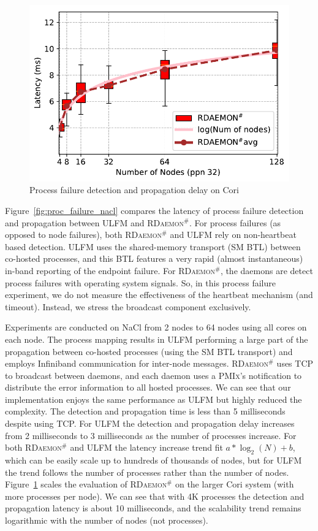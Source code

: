 \documentclass[sigconf]{acmart}
\newcommand{\pmix}[0]{\textsc{PMIx}\xspace}
\newcommand{\ulfm}[0]{\textsc{ULFM}\xspace}
\newcommand{\ourwork}[0]{\textsc{RDaemon}\ensuremath{^\#}\xspace}
\begin{document}
\begin{figure}[h]
  \centering
  \includegraphics[width=\linewidth]{Cori_Process_Failure_fit.pdf}
  \caption{Process failure detection and propagation delay on Cori}
  \label{fig:proc_failure_cori}
\end{figure}

Figure~\ref{fig:proc_failure_nacl} compares the latency of process failure detection and propagation between \ulfm and \ourwork. For process failures (as opposed to node failures), both 
\ourwork and \ulfm rely on non-heartbeat based detection. 
%
\ulfm uses the 
shared-memory transport (SM BTL) between co-hosted processes, and this BTL 
features a very rapid (almost instantaneous) in-band reporting of the 
endpoint failure. For \ourwork, the daemons are detect process failures
with operating system signals. 
%
So, in this process failure experiment, we do not measure 
the effectiveness of the heartbeat mechanism (and timeout). Instead, we  
stress the broadcast component exclusively.

Experiments are conducted on NaCl from 2 nodes to 64 nodes using all cores on each node.
The process mapping results in \ulfm performing a large part of the 
propagation between co-hosted processes (using the SM BTL transport) 
and employs Infiniband communication for inter-node messages. 
\ourwork uses TCP to broadcast between daemons, and each daemon uses a
\pmix's notification to distribute the error information to all hosted processes.
%
 We can see that our implementation enjoys the same performance as \ulfm but highly reduced the complexity. The detection and propagation time is less than 5 milliseconds despite using TCP. For \ulfm the detection and propagation delay increases from 2 milliseconds to 3 milliseconds as the  number of processes increase. For both \ourwork and \ulfm the latency increase trend fit $ a*\log_2(N) + b $, which can be easily scale up to hundreds of thousands of nodes, but for \ulfm
the trend follows the number of processes rather than the number of nodes. Figure~\ref{fig:proc_failure_cori} scales the evaluation of \ourwork on the larger Cori system (with more processes per node). We can see that with 4K processes the detection and propagation latency is about 10 milliseconds, and the scalability trend remains logarithmic with the number of nodes (not processes).
\end{document}
